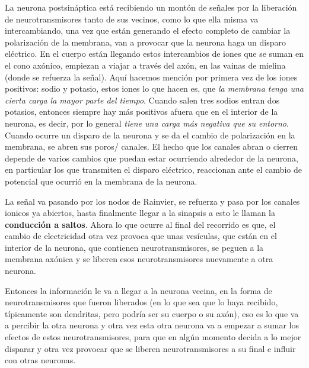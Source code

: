 La neurona postsináptica está recibiendo un montón de señales por la liberación de neurotransmisores tanto de sus vecinos, como lo que ella misma va intercambiando, una vez que están generando el efecto completo de cambiar la polarización de la membrana, van a provocar que la neurona haga un disparo eléctrico. En el cuerpo están llegando estos intercambios de iones que se suman en el cono axónico, empiezan a viajar a través del axón, en las vainas de mielina (donde se refuerza la señal). 
Aquí hacemos mención por primera vez de los iones positivos: sodio y potasio, estos iones lo que hacen es, que \emph{la membrana tenga una cierta carga la mayor parte del tiempo}. Cuando salen tres sodios entran dos potasios, entonces siempre hay más positivos afuera que en el interior de la neurona, es decir, por lo general  \emph{tiene una carga más negativa que su entorno}. Cuando ocurre un disparo de la neurona y se da el cambio de polarización en la membrana, se abren sus poros/ canales. El hecho que los canales abran o cierren depende de varios cambios que puedan estar ocurriendo alrededor de la neurona, en particular los que transmiten el disparo eléctrico, reaccionan ante el cambio de potencial que ocurrió en la membrana de la neurona. 

La señal va pasando por los nodos de Rainvier, se refuerza y pasa por los canales ionicos ya abiertos, hasta finalmente llegar a la sinapsis a esto le llaman la \textbf{conducción a saltos}. Ahora lo que ocurre al final del recorrido es que, el cambio de electricidad otra vez provoca que unas vesículas, que están en el interior de la neurona, que contienen neurotransmisores, se peguen a la membrana axónica y se liberen esos neurotransmisores nuevamente a otra neurona. 

Entonces la información le va a llegar a la neurona vecina, en la forma de neurotransmisores que fueron liberados (en lo que sea que lo haya recibido, típicamente son dendritas, pero podría ser su cuerpo o su axón), eso es lo que va a percibir la otra neurona y otra vez esta otra neurona va a empezar a sumar los efectos de estos neurotransmisores, para que en algún momento decida a lo mejor disparar y otra vez provocar que se liberen neurotransmisores a su final e influir con otras neuronas.


